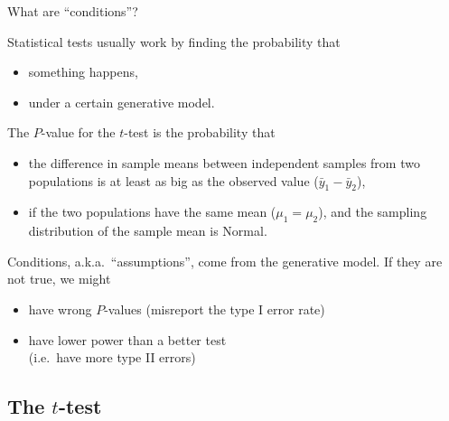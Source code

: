 \begin{frame}{What are ``conditions''?}

  Statistical tests usually work by finding the probability that 
  \begin{itemize}
    \item something happens,
    \item under a certain generative model.
  \end{itemize}

  \vspace{2em}

   The $P$-value for the $t$-test is the probability that 
  \begin{itemize}
    \item the difference in sample means between independent samples from two populations is at least as big as the observed value ($\bar y_1 - \bar y_2$), 
    \item if the two populations have the same mean ($\mu_1 = \mu_2$), and the sampling distribution of the sample mean is Normal.
  \end{itemize}

  \vspace{2em}
  
  \alert{Conditions}, a.k.a.\ ``assumptions'', come from the generative model.
  If they are not true, we might
  \begin{itemize}
    \item have \alert{wrong} $P$-values (misreport the type I error rate)
    \item {} have lower power than a better test \\
      (i.e.\ have more type II errors)
  \end{itemize}

\end{frame}

\subsection{The $t$-test}

